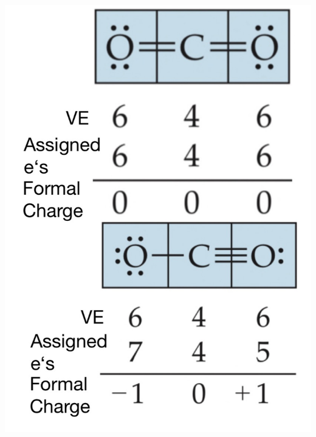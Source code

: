 \begin{minipage}{0.24\linewidth}
    \includegraphics[width = \linewidth]{images/Lewis_Structure_CO2.jpeg}
\end{minipage}

